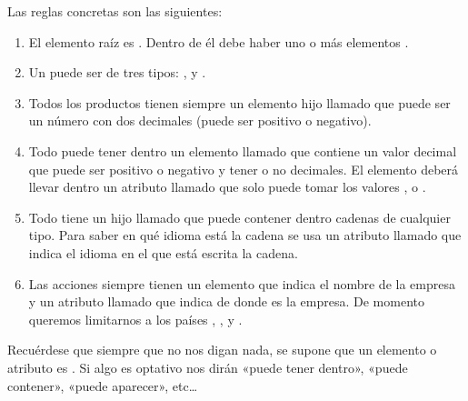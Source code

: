 \documentclass[letterpaper,10pt,spanish]{sphinxmanual}
\begin{document}
Las reglas concretas son las siguientes:
\begin{enumerate}
\item {} 
El elemento raíz es . Dentro de él debe haber uno o más elementos .

\item {} 
Un  puede ser de tres tipos: ,  y .

\item {} 
Todos los productos tienen siempre un elemento hijo llamado  que puede ser un número con dos decimales (puede ser positivo o negativo).

\item {} 
Todo  puede tener dentro un elemento llamado  que contiene un valor decimal que puede ser positivo o negativo y tener o no decimales. El elemento  deberá llevar dentro un atributo llamado  que solo puede tomar los valores ,  o .

\item {} 
Todo  tiene un hijo llamado  que puede contener dentro cadenas de cualquier tipo. Para saber en qué idioma está la cadena se usa un atributo llamado  que indica el idioma en el que está escrita la cadena.

\item {} 
Las acciones siempre tienen un elemento  que indica el nombre de la empresa y un atributo llamado  que indica de donde es la empresa. De momento queremos limitarnos a los países , ,  y .

\end{enumerate}

Recuérdese que siempre que no nos digan nada, se supone que un elemento o atributo es . Si algo es optativo nos dirán «puede tener dentro», «puede contener», «puede aparecer», etc…
\end{document}

